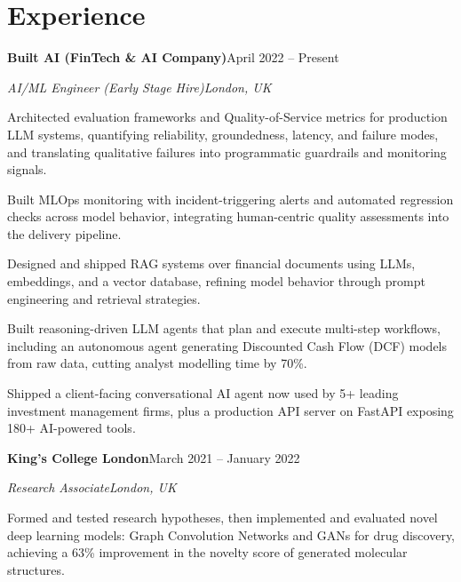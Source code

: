 \documentclass[10pt,a4paper]{article}
\newcommand{\entry}[4]{%
  {\color{company}\bfseries #1}\hfill {\color{muted}#2}\par
  \vspace{1pt}
  {\itshape #3}\hfill {\color{muted}\itshape #4}\par
  \vspace{3pt}%
}
\begin{document}
\section{Experience}
\entry{Built AI (FinTech \& AI Company)}{April 2022 -- Present}{AI/ML Engineer (Early Stage Hire)}{London, UK}
\begin{tight}
  \item Architected evaluation frameworks and Quality-of-Service metrics for production LLM systems, quantifying reliability, groundedness, latency, and failure modes, and translating qualitative failures into programmatic guardrails and monitoring signals.
  \item Built MLOps monitoring with incident-triggering alerts and automated regression checks across model behavior, integrating human-centric quality assessments into the delivery pipeline.
  \item Designed and shipped RAG systems over financial documents using LLMs, embeddings, and a vector database, refining model behavior through prompt engineering and retrieval strategies.
  \item Built reasoning-driven LLM agents that plan and execute multi-step workflows, including an autonomous agent generating Discounted Cash Flow (DCF) models from raw data, cutting analyst modelling time by 70\%.
  \item Shipped a client-facing conversational AI agent now used by 5+ leading investment management firms, plus a production API server on FastAPI exposing 180+ AI-powered tools.
\end{tight}

\entry{King's College London}{March 2021 -- January 2022}{Research Associate}{London, UK}
\begin{tight}
  \item Formed and tested research hypotheses, then implemented and evaluated novel deep learning models: Graph Convolution Networks and GANs for drug discovery, achieving a 63\% improvement in the novelty score of generated molecular structures.
\end{tight}

\end{document}
